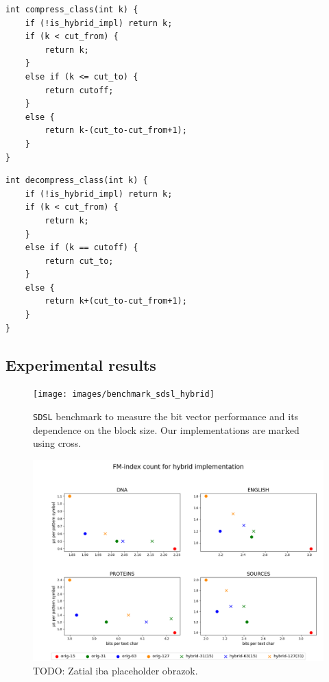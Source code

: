 \begin{lstlisting}
int compress_class(int k) {
	if (!is_hybrid_impl) return k;
	if (k < cut_from) {
		return k;
	}
	else if (k <= cut_to) {
		return cutoff;
	}
	else {
		return k-(cut_to-cut_from+1);
	}
}
\end{lstlisting}

\begin{lstlisting}
int decompress_class(int k) {
	if (!is_hybrid_impl) return k;
	if (k < cut_from) {
		return k;
	}
	else if (k == cutoff) {
		return cut_to;
	}
	else {
		return k+(cut_to-cut_from+1);
	}
}
\end{lstlisting}

\subsection{Experimental results}

\begin{figure}
	\centerline{
		\texttt{[image: images/benchmark\_sdsl\_hybrid]}
	}
	\caption[TODO]{\texttt{SDSL} benchmark to measure the bit vector performance and its dependence
	on the block size. Our implementations are marked using cross.
	}
	\label{obr:benchmark_sdsl_hybrid}
\end{figure}

\begin{figure}
	\centerline{
		\includegraphics[width=\textwidth, height=0.4\textheight]{images/vysledky_sdsl_hybrid_count}
	}
	\caption[TODO]{TODO: Zatial iba placeholder obrazok.
	}
	\label{obr:benchmark_sdsl_hybrid_count}
\end{figure}


